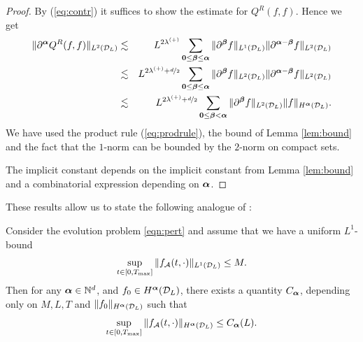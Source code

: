 \begin{proof}
    By (\ref{eq:contr}) it suffices to show the estimate for $Q^R(f,f)$. 
    Hence we get
    \begin{eqnarray*}
        \|\partial^{\bm\alpha} Q^R(f,f)\|_{L^2(\mathcal{D}_L)}
        & \lesssim &
        L^{2\lambda^{(+)}}\sum_{{\bm0} \le {\bm\beta} \le {\bm\alpha}}
        \|\partial^{\bm\beta} f \|_{L^1(\mathcal{D}_L)} 
        \|\partial^{{\bm\alpha} - {\bm\beta}}f\|_{L^2(\mathcal{D}_L)} \\
        & \lesssim &
        L^{2\lambda^{(+)}+\nicefrac{d}{2}}\sum_{{\bm0} \le {\bm\beta} \le {\bm\alpha}}
        \|\partial^{\bm\beta} f \|_{L^2(\mathcal{D}_L)}
        \|\partial^{{\bm\alpha} - {\bm\beta}}f\|_{L^2(\mathcal{D}_L)}
        \\
        &\lesssim &
        L^{2\lambda^{(+)}+\nicefrac{d}{2}} \sum_{{\bm0} \le {\bm\beta} <{\bm\alpha}}
        \|\partial^{\bm\beta} f \|_{L^2(\mathcal{D}_L)} 
        \|f\|_{H^{\bm\alpha}(\mathcal{D}_L)}.
    \end{eqnarray*}
    We have used the product rule (\ref{eq:prodrule}), the bound of Lemma
    \ref{lem:bound} and the fact that the $1$-norm can be bounded by the
    $2$-norm on compact sets.

    The implicit constant depends on the implicit constant from Lemma
    \ref{lem:bound} and a combinatorial expression depending on ${\bm\alpha}$.
\end{proof}
These results allow us to state the following analogue of \cite[Lemma
4.2]{Filbet2011asm}:
\begin{lemma}\label{lem:prop}
    Consider the evolution problem \eqref{eqn:pert} and
    assume that we have a uniform $L^1$-bound 
    \begin{equation}
        \sup_{t\in [0,T_\mathrm{max}]}\|f_{\mathcal{A}}(t,\cdot)\|_{L^1(\mathcal{D}_L)}\le M.
    \end{equation}
    Then for any ${\bm\alpha} \in \mathbb{N}^d$, and $f_0\in H^{\bm\alpha}(\mathcal{D}_L)$, there exists
    a quantity $C_{\bm\alpha}$, depending only on $M,L,T$ and
    $\|f_0\|_{H^{{\bm\alpha}}(\mathcal{D}_L)}$ such that
    \begin{equation}\label{eq:smoothprop}
        \sup_{t\in [0,T_\mathrm{max}]}\|f_{\mathcal{A}}(t,\cdot)\|_{H^{\bm\alpha}(\mathcal{D}_L)}
        \le C_{\bm\alpha}(L).
    \end{equation}
\end{lemma}
